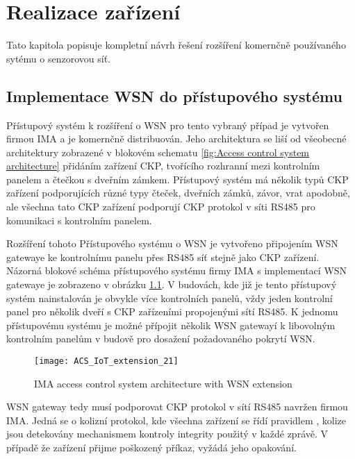 \chapter{Realizace zařízení}
Tato kapitola popisuje kompletní návrh řešení rozšíření komernčně používaného sytému o senzorovou síť.



\section{Implementace WSN do přístupového systému}
\label{Implementace WSN do přístupového systému}
Přístupový systém k rozšíření o WSN pro tento vybraný případ je vytvořen firmou IMA a je komernčně distribuován. Jeho architektura se liší od všeobecné architektury zobrazené v blokovém schematu \ref{fig:Access control system architecture} přidáním zařízení CKP, tvořícího rozhranní mezi kontrolním panelem a čtečkou s dveřním zámkem. Přístupový systém má několik typů CKP zařízení podporujících různé typy čteček, dveřních zámků, závor, vrat apodobně, ale všechna tato CKP zařízení podporují CKP protokol v síti RS485 pro komunikaci s kontrolním panelem.

Rozšíření tohoto Přístupového systému o WSN je vytvořeno připojením WSN gatewaye ke kontrolnímu panelu přes RS485 síť stejně jako CKP zařízení. Názorná blokové schéma přístupového systému firmy IMA s implementací WSN gatewaye je zobrazeno v obrázku \ref{fig:ACS architecture IMA with geteway}.
V budovách, kde již je tento přístupový systém nainstalován je obvykle více kontrolních panelů, vždy jeden kontrolní panel pro několik dveří s CKP zařízeními propojenými sítí RS485. 
K jednomu přístupovému systému je možné přípojit několik WSN gatewayí k libovolným kontrolním panelům v budově pro dosažení požadovaného pokrytí WSN.

\begin{figure}[!h]
\centering
\texttt{[image: ACS\_IoT\_extension\_21]}
\caption{IMA access control system architecture with WSN extension}
\label{fig:ACS architecture IMA with geteway}
\end{figure}


WSN gateway tedy musí podporovat CKP protokol v sítí RS485 navržen firmou IMA. Jedná se o kolizní protokol, kde všechna zařízení se řídí pravidlem \DIFdelbegin {}\DIFdelend \DIFaddbegin {}\DIFaddend , kolize jsou detekovány mechanismem kontroly integrity použitý v každé zprávě. V případě že zařízení přijme poškozený příkaz, vyžádá jeho opakování.

